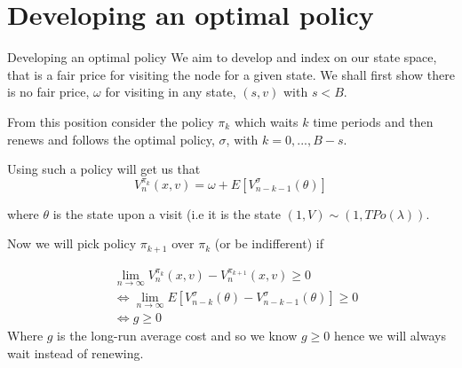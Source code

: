 \documentclass[10pt]{beamer}
\begin{document}
\section{Developing an optimal policy}
\begin{frame}{Developing an optimal policy}
We aim to develop and index on our state space, that is a fair price for visiting the node for a given state. We shall first show there is no fair price, $\omega$ for visiting in any state, $(s,v)$ with $s < B$.

From this position consider the policy $\pi_{k}$ which waits $k$ time periods and then renews and follows the optimal policy, $\sigma$, with $k=0,...,B-s$.

Using such a policy will get us that
\begin{equation}
V_{n}^{\pi_{k}}(x,v)=\omega + E[V_{n-k-1}^{\sigma}(\theta)]
\end{equation}

where $\theta$ is the state upon a visit (i.e it is the state $(1,V) \sim (1,TPo(\lambda))$.

Now we will pick policy $\pi_{k+1}$ over $\pi_{k}$ (or be indifferent) if

\begin{align*}
&\lim\limits_{n \rightarrow \infty} V_{n}^{\pi_{k}} (x,v) - V_{n}^{\pi_{k+1}}(x,v) \geq 0 \\
& \iff \lim\limits_{n \rightarrow \infty} E[V_{n-k}^{\sigma}(\theta) - V_{n-k-1}^{\sigma} (\theta)] \geq 0 \\
& \iff g \geq 0
\end{align*}
Where $g$ is the long-run average cost and so we know $g \geq 0$ hence we will always wait instead of renewing.
\end{frame}
\end{document}

